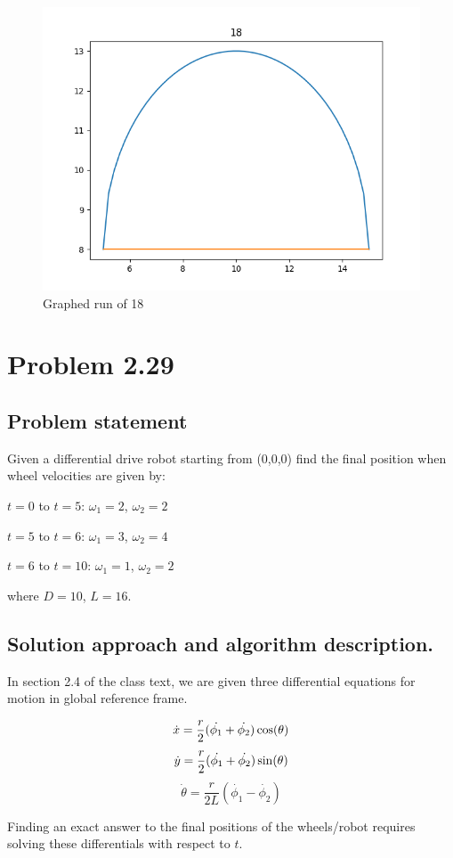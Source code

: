 \documentclass[letterpaper,11pt]{texMemo} %
\begin{document}
\begin{figure}[ht]
\caption{Graphed run of 18}
\centering
\includegraphics[scale=0.7]{img/18.png}
\end{figure}

\newpage
\section*{Problem 2.29}
\subsection*{Problem statement}
Given a differential drive robot starting from (0,0,0) find the final position when wheel
velocities are given by:

$t=0$ to $t=5$: $\omega_1=2$, $\omega_2=2$

$t=5$ to $t=6$: $\omega_1=3$, $\omega_2=4$

$t=6$ to $t=10$: $\omega_1=1$, $\omega_2=2$

where $D=10$, $L=16$.

\subsection*{Solution approach and algorithm description.}
In section 2.4 of the class text, we are given three differential equations
for motion in global reference frame.

\[\dot{x} = \frac{r}{2} (\dot{\phi_1}+\dot{\phi_2})\cos(\theta) \\[4mm]\]
\[\dot{y} = \frac{r}{2} (\dot{\phi_1}+\dot{\phi_2})\sin(\theta) \\[4mm]\]
\[\dot{\theta} = \frac{r}{2L} (\dot{\phi_1}-\dot{\phi_2})\]

Finding an exact answer to the final positions of the wheels/robot requires solving
these differentials with respect to $t$. 
\end{document}

